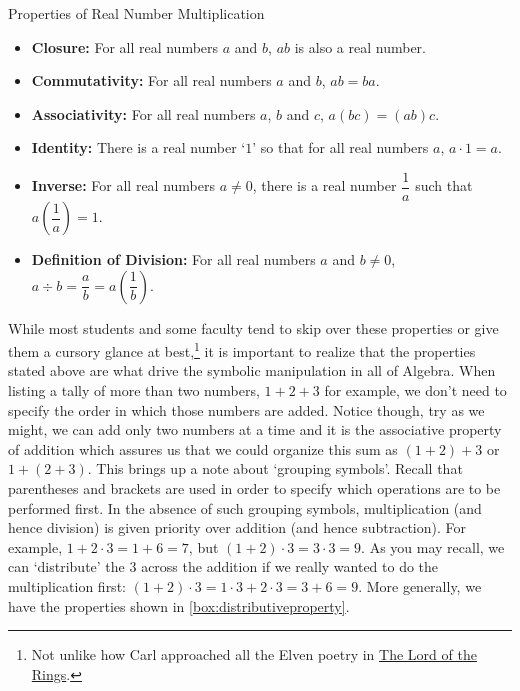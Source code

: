 \begin{floatbox}[label=box:realnumbermultiplication]{Properties of Real Number Multiplication}

\begin{itemize}

\item  \textbf{Closure:}  For all real numbers $a$ and $b$,  $ab$ is also a real number.
\item  \textbf{Commutativity:}  For all real numbers $a$ and $b$, $ab = ba$.
\item  \textbf{Associativity:}  For all real numbers $a$, $b$ and $c$, $a(bc) = (ab)c$.
\item  \textbf{Identity:}  There is a real number `$1$' so that for all real numbers $a$, $a \cdot 1 = a$.
\item  \textbf{Inverse:}  For all real numbers $a \neq 0$, there is a real number $\dfrac{1}{a}$ such that $a \left(\dfrac{1}{a}\right) = 1$.
\item \textbf{Definition of Division:}  For all real numbers $a$ and $b \neq 0$, $a \div b = \dfrac{a}{b} = a  \left(\dfrac{1}{b}\right)$.

\end{itemize}

\end{floatbox}

While most students and some faculty tend to skip over these properties or give them a cursory glance at best,\footnote{Not unlike how Carl approached all the Elven poetry in \underline{The Lord of the Rings}.} it is important to realize that the properties stated above are what drive the symbolic manipulation in all of Algebra.  When listing a tally of more than two numbers, $1 + 2 + 3$\label{howtoaddonetwothree} for example, we don't need to specify the order in which those numbers are added. Notice though, try as we might, we can add only two numbers at a time and it is the associative property of addition which assures us that we could organize this sum as $(1+2) + 3$ or $1+(2+3)$.  This brings up a note about `grouping symbols'.  Recall that parentheses and brackets are used in order to specify which operations are to be performed first.  In the absence of such grouping symbols, multiplication (and hence division) is given priority over addition (and hence subtraction). For example, $1 + 2 \cdot 3 = 1+6 = 7$, but $(1+2) \cdot 3 = 3 \cdot 3 = 9$.  As you may recall, we can `distribute' the $3$ across the addition if we really wanted to do the multiplication first:  $(1+2) \cdot 3 = 1\cdot 3 + 2 \cdot 3 = 3 + 6 = 9$. More generally, we have the properties shown in \autoref{box:distributiveproperty}.


